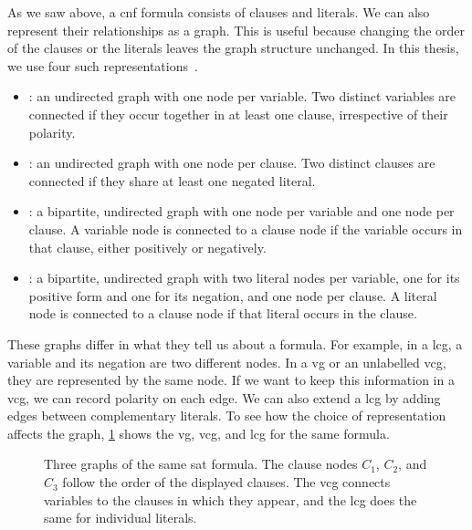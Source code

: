 As we saw above, a \gls{cnf} formula consists of clauses and literals. We can also represent their relationships as a graph. This is useful because changing the order of the clauses or the literals leaves the graph structure unchanged. In this thesis, we use four such representations~\citep{NudEtAl04b,HutEtAl14e,SelEtAl19}.
\begin{itemize}
    \item {}: an undirected graph with one node per variable. Two distinct variables are connected if they occur together in at least one clause, irrespective of their polarity.
    \item {}: an undirected graph with one node per clause. Two distinct clauses are connected if they share at least one negated literal.
    \item {}: a bipartite, undirected graph with one node per variable and one node per clause. A variable node is connected to a clause node if the variable occurs in that clause, either positively or negatively.
    \item {}: a bipartite, undirected graph with two literal nodes per variable, one for its positive form and one for its negation, and one node per clause. A literal node is connected to a clause node if that literal occurs in the clause.
\end{itemize}

These graphs differ in what they tell us about a formula. For example, in a \gls{lcg}, a variable and its negation are two different nodes. In a \gls{vg} or an unlabelled \gls{vcg}, they are represented by the same node. If we want to keep this information in a \gls{vcg}, we can record polarity on each edge. We can also extend a \gls{lcg} by adding edges between complementary literals. To see how the choice of representation affects the graph, \cref{fig:ch03:sat-graphs} shows the \gls{vg}, \gls{vcg}, and \gls{lcg} for the same formula.

\begin{figure}[tbp]
    \centering
    \resizebox{\linewidth}{!}{}
\caption[Graph representations of a  formula]{Three graphs of the same \gls{sat} formula. The clause nodes $C_1$, $C_2$, and $C_3$ follow the order of the displayed clauses. The \gls{vcg} connects variables to the clauses in which they appear, and the \gls{lcg} does the same for individual literals.}
\label{fig:ch03:sat-graphs}
\end{figure}

